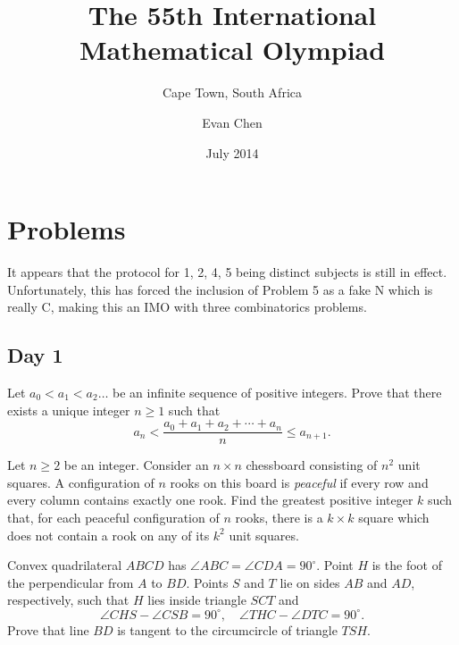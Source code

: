 \documentclass[11pt]{scrreprt}
\numberwithin{figure}{chapter}
\begin{document}
\title{The 55th International Mathematical Olympiad}
\subtitle{Cape Town, South Africa}
\author{Evan Chen}
\date{July 2014}
\maketitle

\tableofcontents

\chapter{Problems}
It appears that the protocol for 1, 2, 4, 5 being distinct subjects is still in effect.
Unfortunately, this has forced the inclusion of Problem 5 as a fake N which is really C, making this an
IMO with three combinatorics problems.
\section{Day 1}
\begin{problem}
  Let $a_0 < a_1 < a_2 \ldots$ be an infinite sequence of positive integers. Prove that there exists a unique integer $n\geq 1$ such that \[a_n < \frac{a_0+a_1+a_2+\cdots+a_n}{n} \leq a_{n+1}.\]
\end{problem}
\begin{problem}
  Let $n \ge 2$ be an integer. Consider an $n \times n$ chessboard consisting of $n^2$ unit squares. A configuration of $n$ rooks on this board is \emph{peaceful} if every row and every column contains exactly one rook. Find the greatest positive integer $k$ such that, for each peaceful configuration of $n$ rooks, there is a $k \times k$ square which does not contain a rook on any of its $k^2$ unit squares.
\end{problem}
\begin{problem}
  Convex quadrilateral $ABCD$ has $\angle ABC = \angle CDA = 90^{\circ}$. Point $H$ is the foot of the perpendicular from $A$ to $BD$. Points $S$ and $T$ lie on sides $AB$ and $AD$, respectively, such that $H$ lies inside triangle $SCT$ and \[
\angle CHS - \angle CSB = 90^{\circ}, \quad \angle THC - \angle DTC = 90^{\circ}. \] Prove that line $BD$ is tangent to the circumcircle of triangle $TSH$.
\end{problem}
\end{document}
